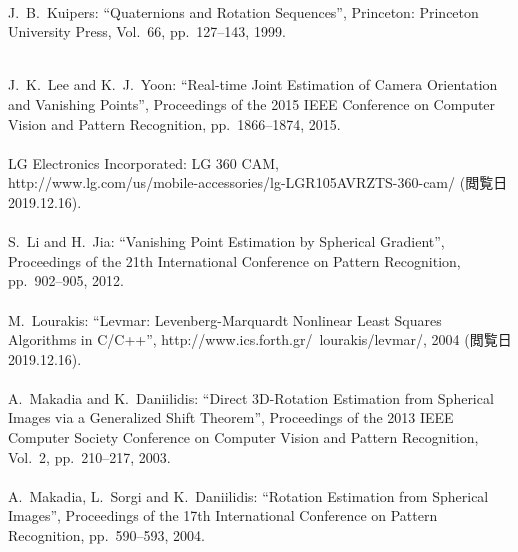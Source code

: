 \begin{mythebibliography}{}
\leavevmode \\J.~B.~Kuipers:
\newblock ``Quaternions and Rotation Sequences'',
\newblock Princeton: Princeton University Press, Vol.~66, pp.~127--143, 1999.
\\


\newpage

\leavevmode \\J.~K.~Lee and K.~J.~Yoon:
\newblock ``Real-time Joint Estimation of Camera Orientation and Vanishing Points'',
\newblock Proceedings of the 2015 IEEE Conference on Computer Vision and Pattern Recognition, pp.~1866--1874, 2015.
\\

\leavevmode \\LG Electronics Incorporated:
\newblock LG 360 CAM,\\
\newblock http://www.lg.com/us/mobile-accessories/lg-LGR105AVRZTS-360-cam/ (閲覧日 2019.12.16).
\\

\leavevmode \\S.~Li and H.~Jia:
\newblock ``Vanishing Point Estimation by Spherical Gradient'',
\newblock Proceedings of the 21th International Conference on Pattern Recognition, pp.~902--905, 2012.
\\

\leavevmode \\M.~Lourakis:
\newblock ``Levmar: Levenberg-Marquardt Nonlinear Least Squares Algorithms in C/C++'',
\newblock http://www.ics.forth.gr/~lourakis/levmar/, 2004 (閲覧日 2019.12.16).
\\

\leavevmode \\A.~Makadia and K.~Daniilidis:
\newblock ``Direct 3D-Rotation Estimation from Spherical Images via a Generalized Shift Theorem'',
\newblock Proceedings of the 2013 IEEE Computer Society Conference on Computer Vision and Pattern Recognition, Vol.~2, pp.~210--217, 2003.
\\

\leavevmode \\A.~Makadia, L.~Sorgi and K.~Daniilidis:
\newblock ``Rotation Estimation from Spherical Images'',
\newblock Proceedings of the 17th International Conference on Pattern Recognition, pp.~590--593, 2004.
\\


\end{mythebibliography}
